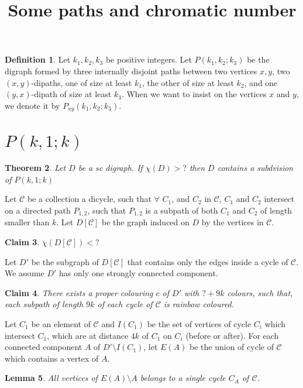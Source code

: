 \documentclass[10pt]{article}
\title{Some paths and chromatic number}
\theoremstyle{plain}
\newtheorem{theorem}{Theorem}
\newtheorem{lemma}[theorem]{Lemma}
\newtheorem{claim}[theorem]{Claim}
\theoremstyle{definition}
\newtheorem{definition}[theorem]{Definition}
\theoremstyle{remark}
\begin{document}
\begin{definition}
Let $k_1,k_2,k_3$ be positive integers. Let $P(k_1,k_2;k_3)$ be the digraph formed by three internally disjoint paths between two vertices $x,y$, two $(x,y)$-dipaths, one of size at least $k_1$, the other of size at least $k_2$, and one $(y,x)$-dipath of size at least $k_3$.
When we want to insist on the vertices $x$ and $y$, we denote it by $P_{xy}(k_1,k_2;k_3)$.
\end{definition}




\section{$P(k,1;k)$}

\begin{theorem}
Let $D$ be a sc digraph. If $\chi(D) > ?$ then $D$ contains a subdvision of $P(k,1;k)$
\end{theorem}

Let $\mathcal{C}$ be a collection a dicycle, such that $\forall$ $C_1$, and $C_2$ in $\mathcal{C}$, $C_1$ and $C_2$ intersect on 
a directed path $P_{1,2}$, such that $P_{1,2}$ is a subpath of both $C_1$ and $C_2$ of length smaller than $k$.
Let $D[\mathcal{C}]$ be the graph induced on $D$ by the vertices in $\mathcal{C}$.

\begin{claim}\label{DC}
$\chi(D[\mathcal{C}]) < ? $
\end{claim}

Let $D'$ be the subgraph of $D[\mathcal{C}]$ that contains only the edges inside a cycle of  $\mathcal{C}$.
We assume $D'$ has only one strongly connected component.


\begin{claim}
There exists a proper colouring $c$ of $D'$ with $? + 9k$ colours, such that, each subpath of length $9k$ of each cycle of $\mathcal{C}$ is rainbow coloured. 
\end{claim}

Let $C_1$ be an element of $\mathcal{C}$ and $I(C_1)$ be the set of vertices of cycle $C_i$ which intersect $C_1$, which are at distance $4k$ 
of $C_1$ on $C_i$ (before or after). For each connected component $A$ 
of $D'\setminus I(C_1)$, let $E(A)$ be the union of cycle of $\mathcal{C}$ which contains a vertex of $A$. 


\begin{lemma}\label{A}
All vertices of $E(A) \setminus A$ belongs to a single cycle $C_A$ of $\mathcal{C}$.
\end{lemma}
\end{document}
